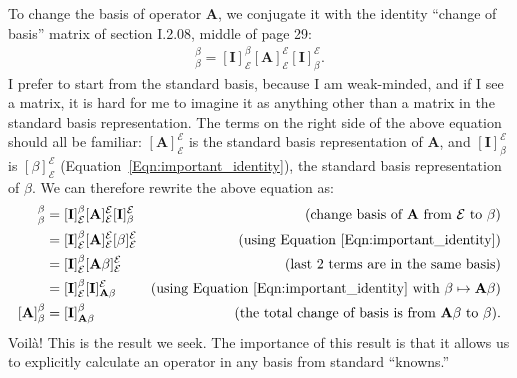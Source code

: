 \documentclass[11pt]{article}
\begin{document}
To change the basis of operator \textbf{A}, we conjugate it with the
identity ``change of basis'' matrix of section I.2.08, middle of page
29:
\begin{align*}
  [\textbf{A}]^\beta_\beta = [\textbf{I}]^\beta_\mathcal{E}
  [\textbf{A}]^\mathcal{E}_\mathcal{E}
  [\textbf{I}]^\mathcal{E}_\beta.
\end{align*}
I prefer to start from the standard basis, because I am weak-minded,
and if I see a matrix, it is hard for me to imagine it as anything
other than a matrix in the standard basis representation.  The terms
on the right side of the above equation should all be familiar:
$[\textbf{A}]^\mathcal{E}_\mathcal{E}$ is the standard basis
representation of \textbf{A}, and $[\textbf{I}]^\mathcal{E}_\beta$ is
$[\beta]^\mathcal{E}_\mathcal{E}$
(Equation~\ref{Eqn:important_identity}), the standard basis
representation of $\beta$.  We can therefore rewrite the above
equation as:
\begin{align*}
  [\textbf{A}]^\beta_\beta &= [\textbf{I}]^\beta_\mathcal{E}
                            [\textbf{A}]^\mathcal{E}_\mathcal{E}
                            [\textbf{I}]^\mathcal{E}_\beta
                                 & (\text{change basis of $\textbf{A}$ from $\mathcal{E}$ to $\beta$})\\
                         &= [\textbf{I}]^\beta_\mathcal{E}
                            [\textbf{A}]^\mathcal{E}_\mathcal{E} 
                            [\beta]^\mathcal{E}_\mathcal{E}
                                 & (\text{using Equation~\ref{Eqn:important_identity}}) \\
                        &= [\textbf{I}]^\beta_\mathcal{E}
                           [\textbf{A}\beta]^\mathcal{E}_\mathcal{E}
                                 & (\text{last 2 terms are in the same basis})\\
                        &= [\textbf{I}]^\beta_\mathcal{E}
                           [\textbf{I}]^\mathcal{E}_{\textbf{A}\beta}
                                 & (\text{using Equation~\ref{Eqn:important_identity} with }\beta\mapsto\textbf{A}\beta )\\
 [\textbf{A}]^\beta_\beta &= [\textbf{I}]^\beta_{\textbf{A}\beta}
                                 & (\text{the total change of basis is from $\textbf{A}\beta$ to $\beta$}).
\end{align*}
Voil\`{a}!  This is the result we seek.  The importance of this result is
that it allows us to explicitly calculate an operator in any basis
from standard ``knowns.''
\end{document}
